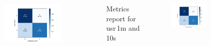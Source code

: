 \documentclass[aspectratio=169,11pt,hyperref={colorlinks=true}]{beamer}
\begin{document}
\begin{frame}
\begin{columns}
      \begin{figure}
        \includegraphics[width=0.8\textwidth,height=0.4\textheight]{graphs/confusion_plots/usr_1m-1min-statusdnn-5x100-500epochs-bs128.png}
      \end{figure}
      \begin{table}[h!]
        \begin{center}
          \caption{Metrics report for usr\,1m and 10s}
      \end{center}
      \end{table}
        \begin{center}
          \begin{figure}
            \includegraphics[width=0.8\textwidth,height=0.4\textheight]{graphs/confusion_plots/usr_1m-10s-statusdnn-5x100-500epochs-bs128.png}
          \end{figure}
        \end{center}
  \end{columns}
\end{frame}
\end{document}
